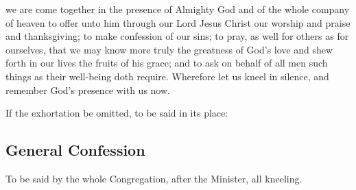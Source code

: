 
 we are come together in the presence of Almighty God and of the whole company of heaven to offer unto him through our Lord Jesus Christ our worship and praise and thanksgiving; to make confession of our sins; to pray, as well for others as for ourselves, that we may know more truly the greatness of God's love and shew forth in our lives the fruits of his grace; and to ask on behalf of all men such things as their well-being doth require. Wherefore let us kneel in silence, and remember God's presence with us now.

\begin{rubric}%
	If the exhortation be omitted, to be said in its place: 
\end{rubric}

\subsection{General Confession}
\begin{rubric}
    To be said by the whole Congregation, after the Minister, all kneeling.
\end{rubric}

